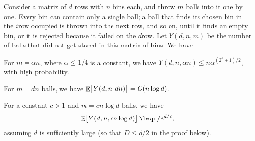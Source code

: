\begin{lemma}
    Consider a matrix of $d$ rows with $n$ bins each, and throw $m$ balls
    into it one by one. Every bin can contain only a single ball; a ball
    that finds its chosen bin in the $i$\th row occupied is thrown into
    the next row, and so on, until it finds an empty bin, or it is
    rejected because it failed on the $d$\th row. Let $Y(d,n, m)$ be the
    number of balls that did not get stored in this matrix of bins. We
    have
    \begin{compactenumA}
        \item For $m = \alpha n$, where $\alpha \leq 1/4$ is a constant,
        we have $Y(d,n, \alpha n ) \leq n \alpha^{(2^{d} + 1)/2}$, with high
        probability.

        \item {} For $m = dn$ balls, we have
        $\mathop{\mathbb{E}}\!\left[ {\bigl. Y(d,n, dn)} \right] = O( n \log d) $.

        \item For a constant $c>1$ and $m = c n \log d$ balls, we have
        \[
            \Ex{\bigl. Y(d,n, c n \log d ) }
            \leq%
            n/e^{d/2},
        \]
        assuming $d$ is sufficiently large (so that $D \leq d/2$ in
        the proof below).
    \end{compactenumA}
\end{lemma}

